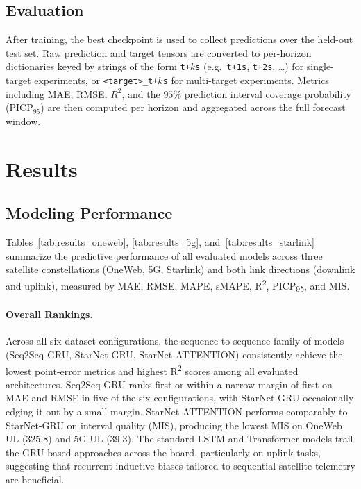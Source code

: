 \documentclass[12pt]{article}
\begin{document}
\subsection{Evaluation}

After training, the best checkpoint is used to collect predictions over the held-out test set. Raw prediction and target tensors are converted to per-horizon dictionaries keyed by strings of the form \texttt{t+$k$s} (e.g.\ \texttt{t+1s}, \texttt{t+2s}, \ldots) for single-target experiments, or \texttt{<target>\_t+$k$s} for multi-target experiments. Metrics including MAE, RMSE, $R^2$, and the $95\%$ prediction interval coverage probability (PICP$_{95}$) are then computed per horizon and aggregated across the full forecast window.

\section{Results}

\subsection{Modeling Performance}

Tables~\ref{tab:results_oneweb}, \ref{tab:results_5g}, and~\ref{tab:results_starlink} summarize the predictive performance of all evaluated models across three satellite constellations (OneWeb, 5G, Starlink) and both link directions (downlink and uplink), measured by MAE, RMSE, MAPE, sMAPE, R\textsuperscript{2}, PICP\textsubscript{95}, and MIS.

\paragraph{Overall Rankings.}
Across all six dataset configurations, the sequence-to-sequence family of models (Seq2Seq-GRU, StarNet-GRU, StarNet-ATTENTION) consistently achieve the lowest point-error metrics and highest R\textsuperscript{2} scores among all evaluated architectures. Seq2Seq-GRU ranks first or within a narrow margin of first on MAE and RMSE in five of the six configurations, with StarNet-GRU occasionally edging it out by a small margin. StarNet-ATTENTION performs comparably to StarNet-GRU on interval quality (MIS), producing the lowest MIS on OneWeb UL (325.8) and 5G UL (39.3). The standard LSTM and Transformer models trail the GRU-based approaches across the board, particularly on uplink tasks, suggesting that recurrent inductive biases tailored to sequential satellite telemetry are beneficial.
\end{document}
